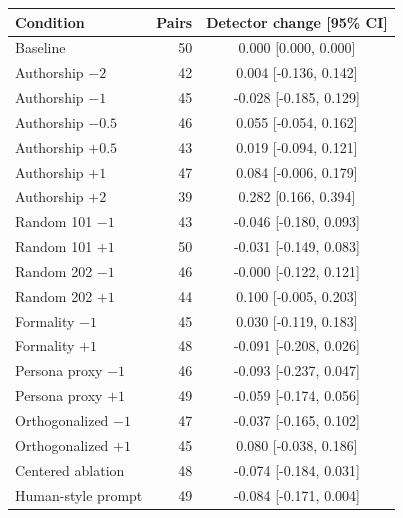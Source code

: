 \begin{tabular}{lrc}
\toprule
Condition & Pairs & Detector change [95\% CI] \\
\midrule
Baseline & 50 & 0.000 [0.000, 0.000] \\
Authorship $-2$ & 42 & 0.004 [-0.136, 0.142] \\
Authorship $-1$ & 45 & -0.028 [-0.185, 0.129] \\
Authorship $-0.5$ & 46 & 0.055 [-0.054, 0.162] \\
Authorship $+0.5$ & 43 & 0.019 [-0.094, 0.121] \\
Authorship $+1$ & 47 & 0.084 [-0.006, 0.179] \\
Authorship $+2$ & 39 & 0.282 [0.166, 0.394] \\
Random 101 $-1$ & 43 & -0.046 [-0.180, 0.093] \\
Random 101 $+1$ & 50 & -0.031 [-0.149, 0.083] \\
Random 202 $-1$ & 46 & -0.000 [-0.122, 0.121] \\
Random 202 $+1$ & 44 & 0.100 [-0.005, 0.203] \\
Formality $-1$ & 45 & 0.030 [-0.119, 0.183] \\
Formality $+1$ & 48 & -0.091 [-0.208, 0.026] \\
Persona proxy $-1$ & 46 & -0.093 [-0.237, 0.047] \\
Persona proxy $+1$ & 49 & -0.059 [-0.174, 0.056] \\
Orthogonalized $-1$ & 47 & -0.037 [-0.165, 0.102] \\
Orthogonalized $+1$ & 45 & 0.080 [-0.038, 0.186] \\
Centered ablation & 48 & -0.074 [-0.184, 0.031] \\
Human-style prompt & 49 & -0.084 [-0.171, 0.004] \\
\bottomrule
\end{tabular}
